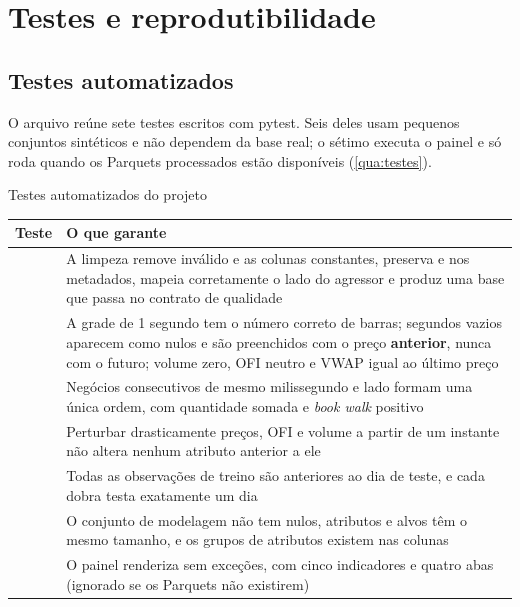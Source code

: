 \chapter{Testes e reprodutibilidade}\label{cap:reprodutibilidade}

\section{Testes automatizados}\label{sec:testes}

O arquivo  reúne sete testes escritos com
pytest. Seis deles usam pequenos conjuntos sintéticos e não dependem da base
real; o sétimo executa o painel e só roda quando os Parquets processados estão
disponíveis (\autoref{qua:testes}).

\begin{quadro}[htbp]
\caption{\label{qua:testes}Testes automatizados do projeto}
\begin{corpotabela}
\begin{tabularx}{\textwidth}{|L{6.4cm}|Y|}
\hline
\textbf{Teste} & \textbf{O que garante} \\ \hline
{} & A limpeza remove  inválido e as colunas constantes, preserva  e  nos metadados, mapeia corretamente o lado do agressor e produz uma base que passa no contrato de qualidade \\ \hline
{} & A grade de 1 segundo tem o número correto de barras; segundos vazios aparecem como nulos e são preenchidos com o preço \textbf{anterior}, nunca com o futuro; volume zero, OFI neutro e VWAP igual ao último preço \\ \hline
{} & Negócios consecutivos de mesmo milissegundo e lado formam uma única ordem, com quantidade somada e \textit{book walk} positivo \\ \hline
{} & Perturbar drasticamente preços, OFI e volume a partir de um instante não altera nenhum atributo anterior a ele \\ \hline
{} & Todas as observações de treino são anteriores ao dia de teste, e cada dobra testa exatamente um dia \\ \hline
{} & O conjunto de modelagem não tem nulos, atributos e alvos têm o mesmo tamanho, e os grupos de atributos existem nas colunas \\ \hline
{} & O painel renderiza sem exceções, com cinco indicadores e quatro abas (ignorado se os Parquets não existirem) \\ \hline
\end{tabularx}
\end{corpotabela}
\fonteautores[Elaborado]
\end{quadro}

